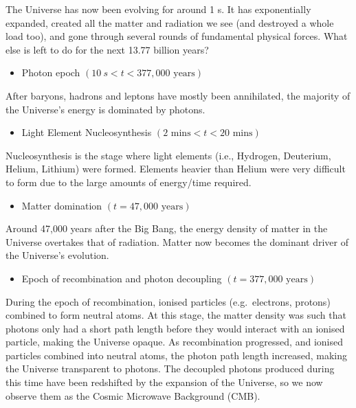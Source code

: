 \documentclass[11pt,a4paper,notoc]{tufte-handout}
\providecommand{\tightlist}{%
  \setlength{\itemsep}{0pt}\setlength{\parskip}{0pt}}
\begin{document}
The Universe has now been evolving for around 1 s. It has exponentially
expanded, created all the matter and radiation we see (and destroyed a
whole load too), and gone through several rounds of fundamental physical
forces. What else is left to do for the next 13.77 billion years?

\begin{itemize}
\tightlist
\item
  Photon epoch \((10~s < t < 377,000\text{ years})\)
\end{itemize}

After baryons, hadrons and leptons have mostly been annihilated, the
majority of the Universe's energy is dominated by photons.

\begin{itemize}
\tightlist
\item
  Light Element Nucleosynthesis \((2 \text{ mins} < t < 20\text{ mins})\)
\end{itemize}

Nucleosynthesis is the stage where light elements (i.e., Hydrogen,
Deuterium, Helium, Lithium) were formed. Elements heavier than Helium
were very difficult to form due to the large amounts of energy/time
required.

\begin{itemize}
\tightlist
\item
  Matter domination \((t = 47,000\text{ years})\)
\end{itemize}

Around 47,000 years after the Big Bang, the energy density of matter in
the Universe overtakes that of radiation. Matter now becomes the
dominant driver of the Universe's evolution.

\begin{itemize}
\tightlist
\item
  Epoch of recombination and photon decoupling \((t = 377,000\text{ years})\)
\end{itemize}

During the epoch of recombination, ionised particles (e.g.~electrons,
protons) combined to form neutral atoms. At this stage, the matter
density was such that photons only had a short path length before they
would interact with an ionised particle, making the Universe opaque. As
recombination progressed, and ionised particles combined into neutral
atoms, the photon path length increased, making the Universe transparent
to photons. The decoupled photons produced during this time have been
redshifted by the expansion of the Universe, so we now observe them as
the Cosmic Microwave Background (CMB).
\end{document}
